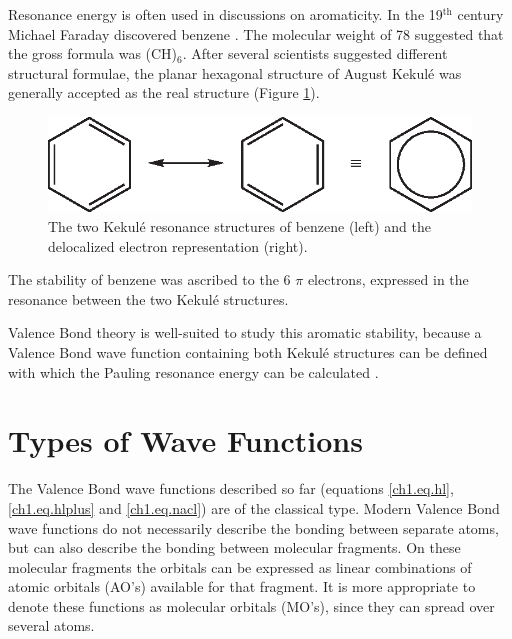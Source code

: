 Resonance energy is often used in discussions on aromaticity. In the 19$^\mathrm{th}$ century Michael Faraday discovered benzene \cite{faraday}. The molecular weight of 78 suggested that the gross formula was (CH)$_6$. After several scientists suggested different structural formulae, the planar hexagonal structure of August Kekul\'e \cite{kekule} was generally accepted as the real structure (Figure \ref{ch1.fig.benzene}). 
\begin{figure}[htdp]
\center
\includegraphics{introduction/figures/benzene.eps}
\caption{The two Kekul\'e resonance structures of benzene (left) and the delocalized electron representation (right).}
\label{ch1.fig.benzene}
\end{figure}
The stability of benzene was ascribed to the 6 $\pi$ electrons, expressed in the resonance between the two Kekul\'e structures.

Valence Bond theory is well-suited to study this aromatic stability, because a Valence Bond wave function containing both Kekul\'{e} structures can be defined with which the Pauling resonance energy can be calculated \cite{pauling5}.

\section{\label{ch1.sec.wavefunctions}Types of Wave Functions}

The Valence Bond wave functions described so far (equations \ref{ch1.eq.hl},\ref{ch1.eq.hlplus} and \ref{ch1.eq.nacl}) are of the classical type. Modern Valence Bond wave functions do not necessarily describe the bonding between separate atoms, but can also describe the bonding between molecular fragments. On these molecular fragments the orbitals can be expressed as linear combinations of atomic orbitals (AO's) available for that fragment. It is more appropriate to denote these functions as molecular orbitals (MO's), since they can spread over several atoms. 

